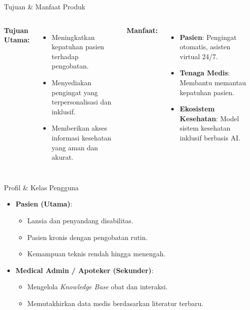 \documentclass[10pt, aspectratio=169]{beamer}
\begin{document}
\begin{frame}{Tujuan \& Manfaat Produk}
    \begin{columns}[T]
        \textbf{Tujuan Utama:}
        \begin{itemize}
            \item Meningkatkan kepatuhan pasien terhadap pengobatan.
            \item Menyediakan pengingat yang terpersonalisasi dan inklusif.
            \item Memberikan akses informasi kesehatan yang aman dan akurat.
        \end{itemize}
        
        \textbf{Manfaat:}
        \begin{itemize}
            \item \textbf{Pasien}: Pengingat otomatis, asisten virtual 24/7.
            \item \textbf{Tenaga Medis}: Membantu memantau kepatuhan pasien.
            \item \textbf{Ekosistem Kesehatan}: Model sistem kesehatan inklusif berbasis AI.
        \end{itemize}
    \end{columns}
\end{frame}

\begin{frame}{Profil \& Kelas Pengguna}
    \begin{itemize}
        \item \textbf{Pasien (Utama)}:
        \begin{itemize}
            \item Lansia dan penyandang disabilitas.
            \item Pasien kronis dengan pengobatan rutin.
            \item Kemampuan teknis rendah hingga menengah.
        \end{itemize}
        \item \textbf{Medical Admin / Apoteker (Sekunder)}:
        \begin{itemize}
            \item Mengelola \textit{Knowledge Base} obat dan interaksi.
            \item Memutakhirkan data medis berdasarkan literatur terbaru.
        \end{itemize}
    \end{itemize}
\end{frame}
\end{document}
